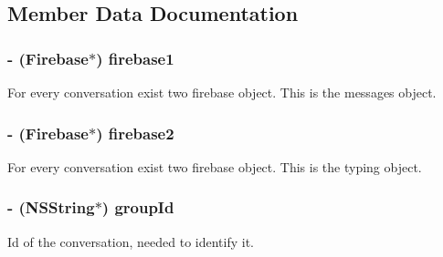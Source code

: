 \subsection{Member Data Documentation}
\hypertarget{category_e_s_messenger_view_07_08_a9fbd9f22e2fbded3d4f28b5f2c07affb}{}
\subsubsection[{firebase1}]{\setlength{\rightskip}{0pt plus 5cm}-\/ (Firebase$\ast$) firebase1\hspace{0.3cm}{\ttfamily [protected]}}\label{category_e_s_messenger_view_07_08_a9fbd9f22e2fbded3d4f28b5f2c07affb}
For every conversation exist two firebase object. This is the messages object. \hypertarget{category_e_s_messenger_view_07_08_a0de899dba26c0fa82baa958ff2669b26}{}
\subsubsection[{firebase2}]{\setlength{\rightskip}{0pt plus 5cm}-\/ (Firebase$\ast$) firebase2\hspace{0.3cm}{\ttfamily [protected]}}\label{category_e_s_messenger_view_07_08_a0de899dba26c0fa82baa958ff2669b26}
For every conversation exist two firebase object. This is the typing object. \hypertarget{category_e_s_messenger_view_07_08_afbb8227a34b74d5383e4d34a99ced891}{}
\subsubsection[{group\+Id}]{\setlength{\rightskip}{0pt plus 5cm}-\/ (N\+S\+String$\ast$) group\+Id\hspace{0.3cm}{\ttfamily [protected]}}\label{category_e_s_messenger_view_07_08_afbb8227a34b74d5383e4d34a99ced891}
Id of the conversation, needed to identify it. \hypertarget{category_e_s_messenger_view_07_08_a074b59250004158658de40929bcd56c4}{}

